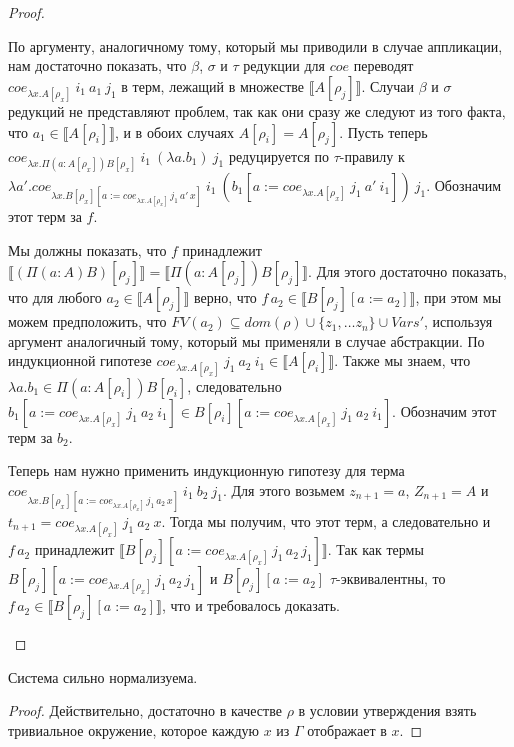 \documentclass{amsart}
\theoremstyle{definition}
\theoremstyle{remark}
\renewcommand{\ll}{\llbracket}
\newcommand{\rr}{\rrbracket}
\numberwithin{figure}{section}
\begin{document}
\begin{proof}
\begin{itemize}
По аргументу, аналогичному тому, который мы приводили в случае аппликации, нам достаточно показать,
    что $\beta$, $\sigma$ и $\tau$ редукции для $coe$ переводят $coe_{\lambda x. A[\rho_x]}\ i_1\ a_1\ j_1$ в терм, лежащий в множестве $\ll A[\rho_j] \rr$.
Случаи $\beta$ и $\sigma$ редукций не представляют проблем, так как они сразу же следуют из того факта, что $a_1 \in \ll A[\rho_i] \rr$, и в обоих случаях $A[\rho_i] = A[\rho_j]$.
Пусть теперь $coe_{\lambda x. \Pi (a : A[\rho_x]) B[\rho_x]}\ i_1\ (\lambda a. b_1)\ j_1$ редуцируется по $\tau$-правилу к
    $\lambda a'. coe_{\lambda x. B[\rho_x][a := coe_{\lambda x. A[\rho_x]}\,j_1\,a'\,x]}\ i_1\ (b_1[a := coe_{\lambda x. A[\rho_x]}\ j_1\ a'\ i_1])\ j_1$.
Обозначим этот терм за $f$.

Мы должны показать, что $f$ принадлежит $\ll (\Pi (a : A) B)[\rho_j] \rr = \ll \Pi (a : A[\rho_j]) B[\rho_j]\rr$.
Для этого достаточно показать, что для любого $a_2 \in \ll A[\rho_j] \rr$ верно, что $f\,a_2 \in \ll B[\rho_j][a := a_2] \rr$,
    при этом мы можем предположить, что $FV(a_2) \subseteq dom(\rho) \cup \{ z_1, \ldots z_n \} \cup Vars'$, используя аргумент аналогичный тому, который мы применяли в случае абстракции.
По индукционной гипотезе $coe_{\lambda x. A[\rho_x]}\ j_1\ a_2\ i_1 \in \ll A[\rho_i] \rr$.
Также мы знаем, что $\lambda a. b_1 \in \Pi (a : A[\rho_i]) B[\rho_i]$,
    следовательно $b_1[a := coe_{\lambda x. A[\rho_x]}\ j_1\ a_2\ i_1] \in B[\rho_i][a := coe_{\lambda x. A[\rho_x]}\ j_1\ a_2\ i_1]$.
Обозначим этот терм за $b_2$.

Теперь нам нужно применить индукционную гипотезу для терма $coe_{\lambda x. B[\rho_x][a := coe_{\lambda x. A[\rho_x]}\,j_1\,a_2\,x]}\ i_1\ b_2\ j_1$.
Для этого возьмем $z_{n+1} = a$, $Z_{n+1} = A$ и $t_{n+1} = coe_{\lambda x. A[\rho_x]}\ j_1\ a_2\ x$.
Тогда мы получим, что этот терм, а следовательно и $f\,a_2$ принадлежит $\ll B[\rho_j][a := coe_{\lambda x. A[\rho_x]}\,j_1\,a_2\,j_1] \rr$.
Так как термы $B[\rho_j][a := coe_{\lambda x. A[\rho_x]}\,j_1\,a_2\,j_1]$ и $B[\rho_j][a := a_2]$ $\tau$-эквивалентны,
    то $f\,a_2 \in \ll B[\rho_j][a := a_2] \rr$, что и требовалось доказать.

\end{itemize}
\end{proof}

\begin{cor}
Система сильно нормализуема.
\end{cor}
\begin{proof}
Действительно, достаточно в качестве $\rho$ в условии утверждения взять тривиальное окружение, которое каждую $x$ из $\Gamma$ отображает в $x$.
\end{proof}

% 
% 
\end{document}
